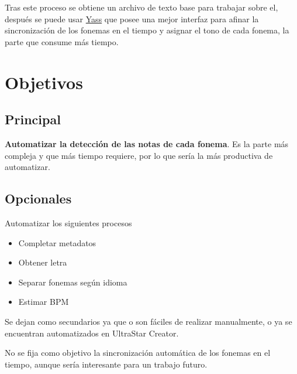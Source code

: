 Tras este proceso se obtiene un archivo de texto base para trabajar sobre el, después se puede usar \href{https://github.com/sarutasan72/Yass}{Yass} que posee una mejor interfaz para afinar la sincronización de los fonemas en el tiempo y asignar el tono de cada fonema, la parte que consume más tiempo.


\section{Objetivos}

\subsection{Principal}

\textbf{Automatizar la detección de las notas de cada fonema}. Es la parte más compleja y que más tiempo requiere, por lo que sería la más productiva de automatizar.

\subsection{Opcionales}

Automatizar los siguientes procesos

\begin{itemize}
	\item Completar metadatos
	\item Obtener letra
	\item Separar fonemas según idioma
	\item Estimar BPM
\end{itemize}

Se dejan como secundarios ya que o son fáciles de realizar manualmente, o ya se encuentran automatizados en UltraStar Creator.

No se fija como objetivo la sincronización automática de los fonemas en el tiempo, aunque sería interesante para un trabajo futuro.